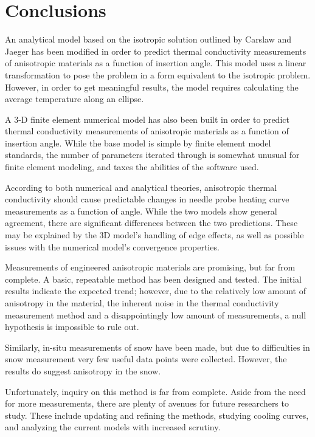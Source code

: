 \chapter{Conclusions}

An analytical model based on the isotropic solution outlined by
Carslaw and Jaeger has been modified in order to predict thermal conductivity
measurements of anisotropic materials as a function of insertion angle.  This
model uses a linear transformation to pose the problem in a form equivalent to
the isotropic problem. However, in order to get meaningful results, the model
requires calculating the average temperature along an ellipse.

A 3-D finite element numerical model has also been built in order to predict
thermal conductivity measurements  of anisotropic materials as a function of
insertion angle. While the base model is simple by finite element model
standards, the number of parameters iterated through is somewhat unusual for
finite element modeling, and taxes the abilities of the software used.

According to both numerical and analytical theories, anisotropic thermal
conductivity should cause predictable changes in needle probe heating curve
measurements as a function of angle. While the two models show general
agreement, there are significant differences between the two predictions. These
may be explained by the 3D model's handling of edge effects, as well as possible
issues with the numerical model's convergence properties.

Measurements of engineered anisotropic materials are promising, but far from
complete. A basic, repeatable method has been designed and tested. The initial
results indicate the expected trend; however, due to the relatively low
amount of anisotropy in the material, the inherent noise in the thermal
conductivity measurement method and a disappointingly low amount of
measurements, a null hypothesis is impossible to rule out.

Similarly, in-situ measurements of snow have been made, but due to difficulties
in snow measurement very few useful data points were collected. However, the
results do suggest anisotropy in the snow.

Unfortunately, inquiry on this method is far from complete. Aside from the need
for more measurements, there are plenty of avenues for future researchers to
study. These include updating and refining the methods, studying cooling curves,
and analyzing the current models with increased scrutiny.
